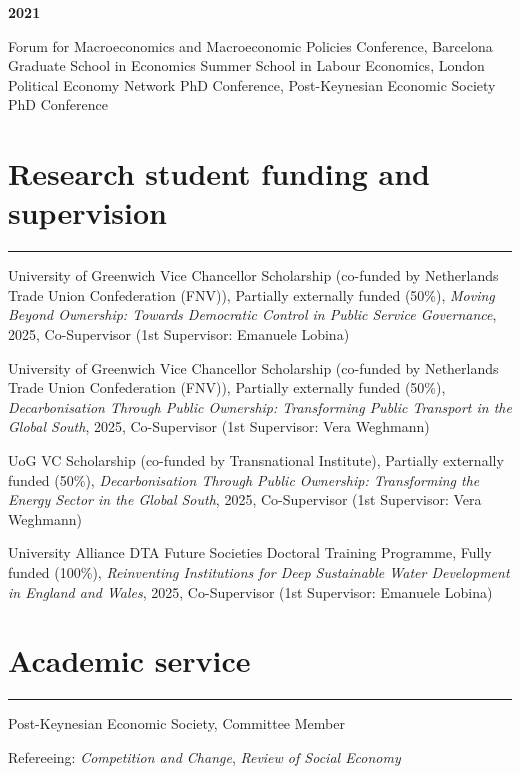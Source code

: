 \documentclass[letterpaper]{article}
\renewenvironment{itemize}{
  \begin{list}{}
    { \setlength{\itemsep}{5pt}
      \setlength{\parsep}{0pt}
      \setlength{\topsep}{0pt}
      \setlength{\leftmargin}{0em} } }{
  \end{list}}
\begin{document}
\textbf{2021}
\begin{itemize}
    \item Forum for Macroeconomics and Macroeconomic Policies Conference, Barcelona Graduate School in Economics Summer School in Labour Economics, London Political Economy Network PhD Conference, Post-Keynesian Economic Society PhD Conference
\end{itemize}

\section*{Research student funding and supervision}
\hrule
\vspace{2mm}
\begin{itemize}
    \item University of Greenwich Vice Chancellor Scholarship (co-funded by Netherlands Trade Union Confederation (FNV)), Partially externally funded (50\%), \textit{Moving Beyond Ownership: Towards Democratic Control in Public Service Governance}, 2025, Co-Supervisor (1st Supervisor: Emanuele Lobina)
    \item University of Greenwich Vice Chancellor Scholarship (co-funded by Netherlands Trade Union Confederation (FNV)), Partially externally funded (50\%), \textit{Decarbonisation Through Public Ownership: Transforming Public Transport in the Global South}, 2025, Co-Supervisor (1st Supervisor: Vera Weghmann)
    \item UoG VC Scholarship (co-funded by Transnational Institute), Partially externally funded (50\%), \textit{Decarbonisation Through Public Ownership: Transforming the Energy Sector in the Global South}, 2025, Co-Supervisor (1st Supervisor: Vera Weghmann)
    \item University Alliance DTA Future Societies Doctoral Training Programme, Fully funded (100\%), \textit{Reinventing Institutions for Deep Sustainable Water Development in England and Wales}, 2025, Co-Supervisor (1st Supervisor: Emanuele Lobina)
\end{itemize}

\section*{Academic service}
\hrule
\vspace{2mm}
\begin{itemize}
    \item Post-Keynesian Economic Society, Committee Member
    \item Refereeing: \textit{Competition and Change}, \textit{Review of Social Economy} %
\end{itemize}
\end{document}
